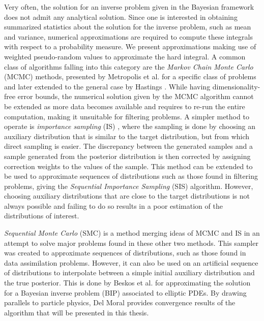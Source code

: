 Very often, the solution for an inverse problem given in the Bayesian framework does not admit any analytical solution. Since one is interested in obtaining summarized statistics about the solution for the inverse problem, such as mean and variance, numerical approximations are required to compute these integrals with respect to a probability measure. We present approximations making use of weighted pseudo-random values to approximate the hard integral. A common class of algorithms falling into this category are the \textit{Markov Chain Monte Carlo} (MCMC) methods, presented by Metropolis et al. \cite{metropolis1953equation} for a specific class of problems and later extended to the general case by Hastings \cite{hastings1970monte}. While having dimensionality-free error bounds, the numerical solution given by the MCMC algorithm cannot be extended as more data becomes available and requires to re-run the entire computation, making it unsuitable for filtering problems. A simpler method to operate is \textit{importance sampling} (IS) \cite[Chapter 3]{Robert}, where the sampling is done by choosing an auxiliary distribution that is similar to the target distribution, but from which direct sampling is easier. The discrepancy between the generated samples and a sample generated from the posterior distribution is then corrected by assigning correction weights to the values of the sample. This method can be extended to be used to approximate sequences of distributions such as those found in filtering problems, giving the \textit{Sequential Importance Sampling} (SIS) algorithm. However, choosing auxiliary distributions that are close to the target distributions is not always possible and failing to do so results in a poor estimation of the distributions of interest.

\textit{Sequential Monte Carlo} (SMC) \cite{del_moral_2006} is a method merging ideas of MCMC and IS in an attempt to solve major problems found in these other two methods. This sampler was created to approximate sequences of distributions, such as those found in data assimilation problems. However, it can also be used on an artificial sequence of distributions to interpolate between a simple initial auxiliary distribution and the true posterior. This is done by Beskos et al. \cite{beskos2015sequential} for approximating the solution for a Bayesian inverse problem (BIP) associated to elliptic PDEs. By drawing parallels to particle physics, Del Moral \cite{del2013mean, del2004feynman} provides convergence results of the algorithm that will be presented in this thesis.

